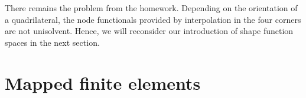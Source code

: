 

\begin{remark}
  There remains the problem from the homework. Depending on the
  orientation of a quadrilateral, the node functionals provided by
  interpolation in the four corners are not unisolvent. Hence, we will
  reconsider our introduction of shape function spaces in the next
  section.
\end{remark}

\section{Mapped finite elements}

